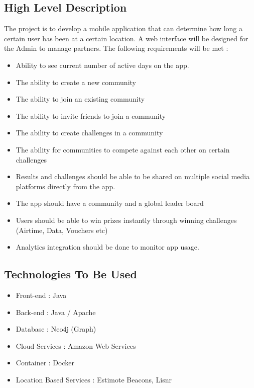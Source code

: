 \documentclass[11pt]{article}
\begin{document}
\subsection{High Level Description}
The project is to develop a mobile application that can determine how long a certain user has been at a certain location. A web interface will be designed for the Admin to manage partners.
\newline
\newline The following requirements will be met : 
\begin{itemize}
\item Ability to see current number of active days on the app.
\item The ability to create a new community
\item The ability to join an existing community
\item The ability to invite friends to join a community
\item The ability to create challenges in a community 
\item The ability for communities to compete against each other on certain challenges
\item Results and challenges should be able to be shared on multiple social media platforms directly from the app.
\item The app should have a community and a global leader board
\item Users should be able to win prizes instantly through winning challenges (Airtime, Data, Vouchers etc)
\item Analytics integration should be done to monitor app usage.
\end{itemize}


\subsection{Technologies To Be Used}
\begin{itemize}
\item Front-end : Java 
\item Back-end : Java / Apache
\item Database : Neo4j (Graph)
\item Cloud Services : Amazon Web Services
\item Container : Docker
\item Location Based Services : Estimote Beacons, Lisnr
\end{itemize}
\end{document}
